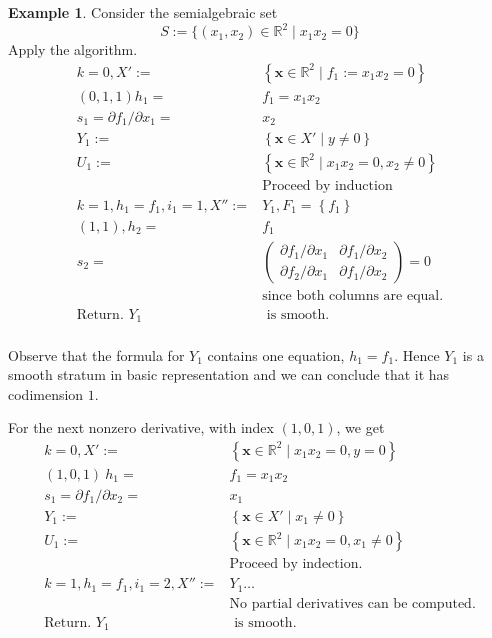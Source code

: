 \documentclass[
]{book}
\theoremstyle{definition}
\theoremstyle{definition}
\newtheorem{example}{Example}[chapter]
\theoremstyle{definition}
\theoremstyle{definition}
\theoremstyle{remark}
\begin{document}
\begin{example}
Consider the semialgebraic set
\[
S := \{ (x_1,x_2) \in \mathbb{R}^2 \mid x_1 x_2 = 0 \}
\]
Apply the algorithm.
\begin{align*}
k=0,X':=&\left\{ \mathbf{x}\in\mathbb{R}^{2}\mid f_{1}:=x_{1}x_{2}=0\right\} \\\left(0,1,1\right)h_{1}=&f_{1}=x_{1}x_{2}\\s_{1}=\partial f_{1}/\partial x_{1}=&x_{2}\\Y_{1}:=&\left\{ \mathbf{x}\in X'\mid y\ne0\right\} \\U_{1}:=&\left\{ \mathbf{x}\in \mathbb{R}^2\mid x_{1}x_{2}=0,x_{2}\ne0\right\} \\&\text{Proceed by induction}\\
k=1,h_{1}=f_{1},i_{1}=1,X'':=&Y_{1},F_{1}=\left\{ f_{1}\right\} \\\left(1,1\right),h_{2}=&f_{1}\\s_{2}=&\begin{pmatrix}\partial f_{1}/\partial x_{1} & \partial f_{1}/\partial x_{2}\\
\partial f_{2}/\partial x_{1} & \partial f_{1}/\partial x_{2}
\end{pmatrix}=0\\&\text{since both columns are equal.}\\\text{Return. }Y_{1}&\text{ is smooth.}\\
\end{align*}

Observe that the formula for \(Y_1\) contains one equation, \(h_1 = f_1\). Hence \(Y_1\) is a smooth stratum in basic representation and we can conclude that it has codimension \(1\).

For the next nonzero derivative, with index \((1,0,1)\), we get
\begin{align*}
k=0,X':=&\left\{ \mathbf{x}\in\mathbb{R}^{2}\mid x_{1}x_{2}=0,y=0\right\} \\\left(1,0,1\right)\ h_{1}=&f_{1}=x_{1}x_{2}\\s_{1}=\partial f_{1}/\partial x_{2}=&x_{1}\\Y_{1}:=&\left\{ \mathbf{x}\in X'\mid x_{1}\ne0\right\} \\U_{1}:=&\left\{ \mathbf{x}\in\mathbb{R}^{2}\mid x_{1}x_{2}=0,x_{1}\ne0\right\} \\&\text{Proceed by indection.}\\k=1,h_{1}=f_{1},i_{1}=2,X'':=&Y_{1}\ldots\\&\text{No partial derivatives can be computed.}\\\text{Return. }Y_{1}&\text{ is smooth.}
\end{align*}


\end{example}
\end{document}

